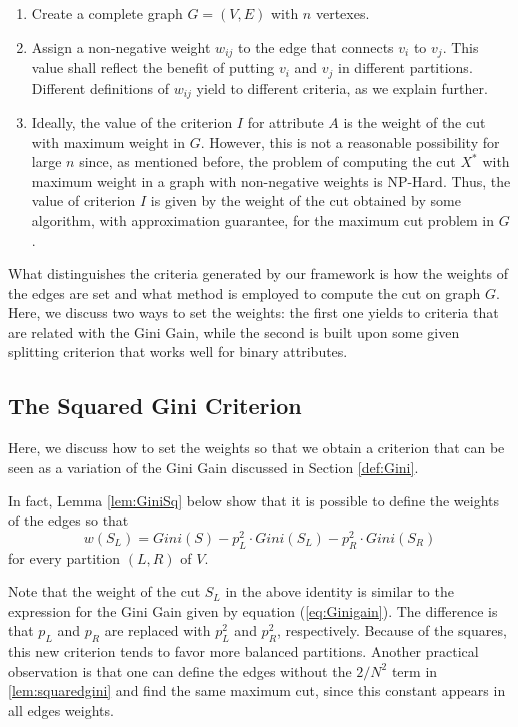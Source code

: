 \begin{enumerate}
\item  Create a complete graph $G=(V,E)$ with $n$ vertexes.

\item  Assign a non-negative weight $w_{ij}$ to the edge 
that connects $v_i$ to $v_j$. This value shall reflect the benefit of putting  $v_i$ and $v_j$ in different partitions.
Different definitions of $w_{ij}$ yield to different criteria,
as we explain further.

\item  Ideally, the value of the criterion $I$ for attribute
$A$ is the weight of the cut with maximum weight  in $G$.
However, this is not a reasonable possibility for large $n$ since, as mentioned before, the problem of computing the  cut $X^*$ with maximum weight in a graph with non-negative weights is NP-Hard.
Thus, the value of criterion $I$ is given by the weight
of the cut obtained by some  algorithm, with approximation guarantee, for the maximum cut
problem in $G$.   
\end{enumerate}

What distinguishes the  criteria
generated  by our framework
is how the weights of the edges are set and what 
method is employed to compute the cut on graph $G$.
Here, we discuss two ways to set the weights:
the first one yields to criteria that
are related with the Gini Gain, while the second 
is built upon some given splitting  criterion that works well for binary attributes.


\subsection{The Squared Gini Criterion}
Here, we discuss how to set the weights so that we obtain 
a criterion that can be seen as a variation of the Gini Gain discussed in Section \ref{def:Gini}.

In fact, Lemma \ref{lem:GiniSq} below  show that  it is possible to define the
weights of the edges so that 
\begin{equation}
 \label{lem:squaredgini}
w(S_L)= Gini(S) - p^2_L \cdot Gini(S_L) - p^2_R \cdot Gini(S_R) 
\end{equation}
for every partition $(L,R)$ of $V$. 

Note that the weight of the cut  $S_L$ in the above identity 
is similar to the expression for the Gini Gain given by equation (\ref{eq:Ginigain}).
The difference is that $p_L$ and $p_R$ are replaced with
$p_L^2$ and $p_R^2$, respectively. Because of the squares, this new criterion tends to favor more balanced partitions. Another practical observation is that one can define the edges without the $2/N^2$ term in \ref{lem:squaredgini} and find the same maximum cut, since this constant appears in all edges weights.

